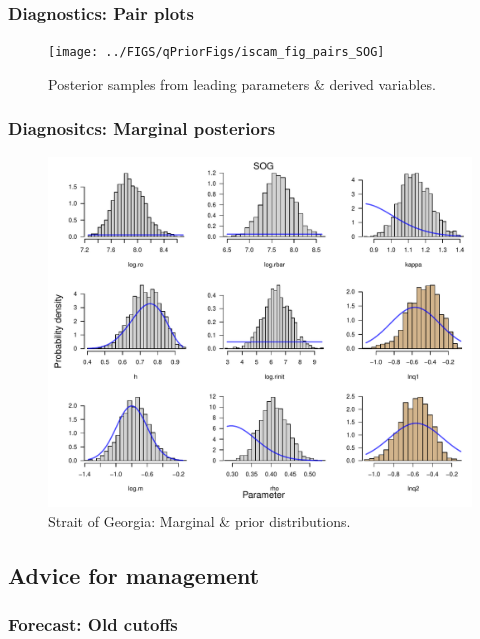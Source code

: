 %
\begin{frame}[t]\frametitle{Diagnostics: Pair plots}
	\begin{figure}[htbp]
		\centering
		\vspace{-0.75cm}	\texttt{[image: ../FIGS/qPriorFigs/iscam\_fig\_pairs\_SOG]}
		\vspace{-0.65cm}
		\caption{Posterior samples from leading parameters \& derived variables.}
	\end{figure}
\end{frame}
%
\begin{frame}[t]\frametitle{Diagnositcs: Marginal posteriors}
	\begin{figure}[htbp]
		\centering
			\includegraphics[scale=0.4]{../FIGS/qPriorFigs/iscam_fig_marginals_SOG}
		\caption{Strait of Georgia: Marginal \& prior distributions.}
	\end{figure}
\end{frame}

\subsection{Advice for management} %
\label{sub:advice_for_management}
%
\begin{frame}[t,shrink=35]\frametitle{Forecast: Old cutoffs}
\end{frame}
